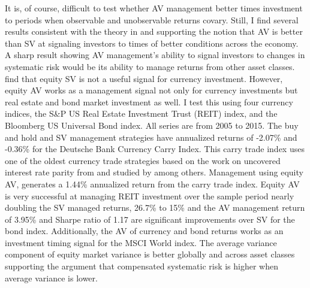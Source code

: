 It is, of course, difficult to test whether AV management better times investment to periods when observable and unobservable returns covary. Still, I find several results consistent with the theory in \citet{pollet_average_2010} and supporting the notion that  AV is better than SV at signaling investors to times of better conditions across the economy. A sharp result showing AV management's ability to signal investors to changes in systematic risk would be its ability to manage returns from other asset classes. \citet{moreira_volatility-managed_2017} find that equity SV is not a useful signal for currency investment. However, equity AV works as a management signal not only for currency investments but real estate and bond market investment as well. %
I test this using four currency indices, the S\&P US Real Estate Investment Trust (REIT) index, and the Bloomberg US Universal Bond index. All series are from 2005 to 2015. The buy and hold and SV management strategies have annualized returns of -2.07\% and -0.36\% for the Deutsche Bank Currency Carry Index. This carry trade index uses one of the oldest currency trade strategies based on the work on uncovered interest rate parity from \citet{noauthor_speculative_nodate,fama_forward_1984} and studied by \citet{lustig_cross_2007,brunnermeier_carry_nodate,burnside_carry_2011} among others. Management using equity AV, generates a 1.44\% annualized return from the carry trade index. %
Equity AV is very successful at managing REIT investment over the sample period nearly doubling the SV managed returns, 26.7\% to 15\% and the AV management return of 3.95\% and Sharpe ratio of 1.17 are significant improvements over SV for the bond index. Additionally, the AV of currency and bond returns works as an investment timing signal for the MSCI World index. The average variance component of equity market variance is better globally and across asset classes supporting the argument that compensated systematic risk is higher when average variance is lower.

